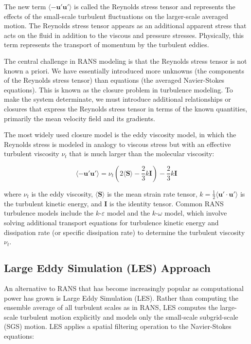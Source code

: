 ﻿\documentclass[a4paper,11pt]{article}
\theoremstyle{definition}
\begin{document}
The new term $\langle -\mathbf{u}' \mathbf{u}' \rangle$ is called the Reynolds stress tensor and represents the effects of the small-scale turbulent fluctuations on the larger-scale averaged motion. The Reynolds stress tensor appears as an additional apparent stress that acts on the fluid in addition to the viscous and pressure stresses. Physically, this term represents the transport of momentum by the turbulent eddies.

The central challenge in RANS modeling is that the Reynolds stress tensor is not known a priori. We have essentially introduced more unknowns (the components of the Reynolds stress tensor) than equations (the averaged Navier-Stokes equations). This is known as the closure problem in turbulence modeling. To make the system determinate, we must introduce additional relationships or closures that express the Reynolds stress tensor in terms of the known quantities, primarily the mean velocity field and its gradients.

The most widely used closure model is the eddy viscosity model, in which the Reynolds stress is modeled in analogy to viscous stress but with an effective turbulent viscosity $\nu_t$ that is much larger than the molecular viscosity:

\begin{equation}
\langle -\mathbf{u}' \mathbf{u}' \rangle = \nu_t \left( 2 \langle \mathbf{S} \rangle - \frac{2}{3} k \mathbf{I} \right) - \frac{2}{3} k \mathbf{I}
\label{eq:boussinesq}
\end{equation}

where $\nu_t$ is the eddy viscosity, $\langle \mathbf{S} \rangle$ is the mean strain rate tensor, $k = \frac{1}{2} \langle \mathbf{u}' \cdot \mathbf{u}' \rangle$ is the turbulent kinetic energy, and $\mathbf{I}$ is the identity tensor. Common RANS turbulence models include the $k$-$\varepsilon$ model and the $k$-$\omega$ model, which involve solving additional transport equations for turbulence kinetic energy and dissipation rate (or specific dissipation rate) to determine the turbulent viscosity $\nu_t$.

\subsection{Large Eddy Simulation (LES) Approach}

An alternative to RANS that has become increasingly popular as computational power has grown is Large Eddy Simulation (LES). Rather than computing the ensemble average of all turbulent scales as in RANS, LES computes the large-scale turbulent motion explicitly and models only the small-scale subgrid-scale (SGS) motion. LES applies a spatial filtering operation to the Navier-Stokes equations:
\end{document}
